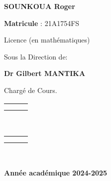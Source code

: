 \documentclass[a4paper, 14pt]{report}
\begin{document}
\begin{center}
{\begin{center}
\textbf{SOUNKOUA Roger}
\end{center}

\begin{center}
\textbf{Matricule }: 21A1754FS
\end{center}

\begin{center}
Licence (en mathématiques)
\end{center}

\begin{center}
Sous la Direction de:
\end{center}

\begin{center}
\textbf{ Dr Gilbert MANTIKA }
\end{center}
\begin{center}
Chargé de Cours.
\end{center}
\begin{center}

\begin{tabularx}{\textwidth}{>{\centering}XcX<{\centering}}
	
	& & \\
	& & \\
	
\end{tabularx}\\


\begin{tabularx}{\textwidth}{>{\centering}XcX<{\centering}}
	
	& & \\
	& & \\
\end{tabularx}\

\textbf{Année académique 2024-2025}

\end{center} \thispagestyle{empty}
}

\normalsize




\end{center} \thispagestyle{empty}
\end{document}
